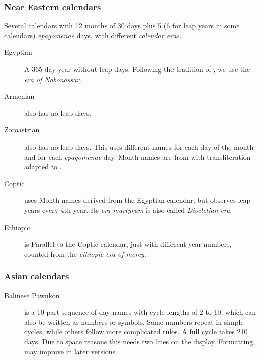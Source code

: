 \subsubsection{Near Eastern calendars}
Several calendars with 12 months of 30 days plus 5 (6 for leap years
in some calendars) \emph{epagomenae} days, with different \emph{calendar eras}.
\begin{description}
\item[Egyptian] A 365 day year without leap days. Following the
  tradition of , we use the \emph{era of Nabonassar}.
\item[Armenian] also has no leap days.
\item[Zoroastrian] also has no leap days. This uses different names
  for each day of the month and for each \emph{epagomenae} day. Month
  names are from \citet[\S69]{Ginzel:ChronologieI} with
  transliteration adapted to \citet{Reingold-Dershowitz:2018}.
\item[Coptic] uses Month names derived from the Egyptian calendar, but observes
  leap years every 4th year. Its \emph{era martyrum} is also called
  \emph{Diocletian era}.
\item[Ethiopic] is Parallel to the Coptic calendar, just with different
  year numbers, counted from the \emph{ethiopic era of mercy}.
\end{description}

\subsubsection{Asian calendars}
\begin{description}
\item[Balinese Pawukon] is a 10-part sequence of day names with cycle
  lengths of 2 to 10, which can also be written as numbers or
  symbols. Some numbers repeat in simple cycles, while others follow
  more complicated rules. A full cycle takes 210 days.  Due to space
  reasons this needs two lines on the display. Formatting may improve
  in later versions.
\end{description}

